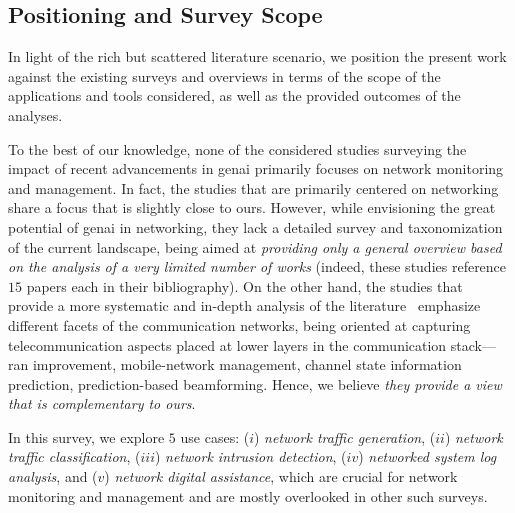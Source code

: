 \subsection{Positioning and Survey Scope}
\label{subsec:positioning}

In light of the rich but scattered literature scenario,
we position the present work against the existing
surveys and overviews in terms of the scope of the applications and tools considered,
as well as the provided outcomes of the analyses.

To the best of our knowledge, none of the considered studies surveying the impact of recent advancements in \gls{genai} primarily focuses on network monitoring and management.
In fact, the studies that are primarily centered on networking~\cite{huang2023large, huang2024digital, liu2024large} share a focus that is slightly close to ours.
However, while envisioning the great potential of \gls{genai} in networking, they lack a detailed survey and taxonomization of the current landscape, being aimed at \emph{providing only a general overview based on the analysis of a very limited number of works} (indeed, these studies reference $15$ papers each in their bibliography).
On the other hand, the studies that provide a more systematic and in-depth analysis of the literature~\cite{zhou2024large, karapantelakis2024generative} emphasize different facets of the communication networks, being oriented at capturing telecommunication aspects placed at lower layers in the communication stack---\eg \gls{ran} improvement, mobile-network management, channel state information prediction, prediction-based beamforming.
Hence, we believe \emph{they provide a view that is complementary to ours}.

In this survey,
we explore $5$ use cases:
($i$) \emph{network traffic generation}, ($ii$) \emph{network traffic classification}, ($iii$) \emph{network intrusion detection}, ($iv$) \emph{networked system log analysis}, and ($v$) \emph{network digital assistance}, which are crucial for network monitoring and management and are mostly overlooked in other such surveys.




